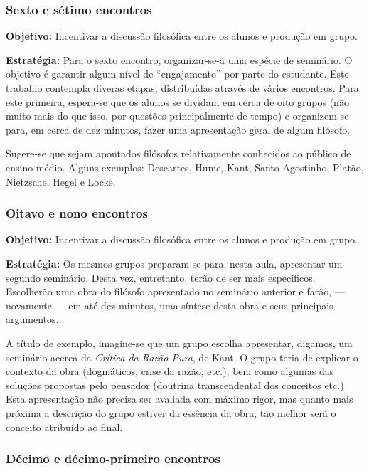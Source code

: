 \documentclass[12pt,a4paper]{article}
\begin{document}
	\subsubsection{Sexto e sétimo encontros}
	
	\textbf{Objetivo:} Incentivar a discussão filosófica entre 
	os alunos e produção em grupo. 

	\textbf{Estratégia:}
	Para o sexto encontro, organizar-se-á uma espécie de seminário. 
	O objetivo é garantir algum nível de ``engajamento'' por parte 
	do estudante. Este trabalho contempla diveras etapas, distribuídas 
	através de vários encontros. Para este primeira, espera-se que 
	os alunos se dividam em cerca de oito grupos (não muito mais do que 
	isso, por questões principalmente de tempo) e organizem-se para, 
	em cerca de dez minutos, fazer uma apresentação geral de algum
	filósofo. 
	
	Sugere-se que sejam apontados filósofos relativamente conhecidos 
	ao público de ensino médio. Alguns exemplos: Descartes, Hume, 
	Kant, Santo Agostinho, Platão, Nietzsche, Hegel e Locke. 
	
	\subsubsection{Oitavo e nono encontros}
	
	\textbf{Objetivo:} Incentivar a discussão filosófica entre 
	os alunos e produção em grupo. 

	\textbf{Estratégia:}
	Os mesmos grupos preparam-se para, nesta aula, apresentar um 
	segundo seminário. Desta vez, entretanto, terão de ser mais 
	específicos. Escolherão uma obra do filósofo apresentado no 
	seminário anterior e farão, --- novamente --- em até dez minutos, 
	uma síntese desta obra e seus principais argumentos. 
	
	A título de exemplo, imagine-se que um grupo escolha apresentar, 
	digamos, um seminário acerca da \textit{Crítica da Razão Pura}, 
	de Kant. O grupo teria de explicar o contexto da obra (dogmáticos, 
	crise da razão, etc.), bem como algumas das soluções propostas 
	pelo pensador (doutrina transcendental dos conceitos etc.) Esta 
	apresentação não precisa ser avaliada com máximo rigor, mas quanto 
	mais próxima a descrição do grupo estiver da essência da obra, 
	tão melhor será o conceito atribuído ao final. 
	
	\subsubsection{Décimo e décimo-primeiro encontros}
	
\end{document}
